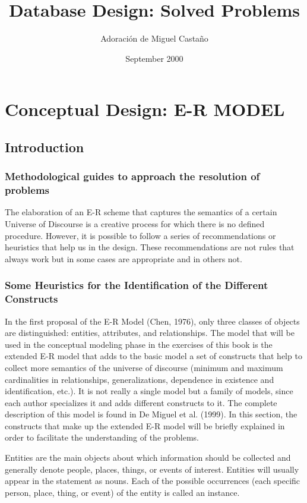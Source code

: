 \documentclass{article}
\title{Database Design: Solved Problems}
\author{Adoración de Miguel Castaño}
\date{September 2000}
\begin{document}
\maketitle

\section{Conceptual Design: E-R MODEL}

\subsection{Introduction}

\subsubsection{
    Methodological guides to approach the resolution of problems
}

The elaboration of an E-R scheme that captures the semantics of a certain Universe of Discourse is a creative process for which there is no defined procedure.  However, it is possible to follow a series of recommendations or heuristics that help us in the design. These recommendations are not rules that always work but in some cases are appropriate and in others not.

\subsubsection{
    Some Heuristics for the Identification of the Different Constructs
}

In the first proposal of the E-R Model (Chen, 1976), only three classes of objects are distinguished: entities, attributes, and relationships. The model that will be used in the conceptual modeling phase in the exercises of this book is the extended E-R model that adds to the basic model a set of constructs that help to collect more semantics of the universe of discourse (minimum and maximum cardinalities in relationships, generalizations, dependence in existence and identification, etc.).  It is not really a single model but a family of models, since each author specializes it and adds different constructs to it.  The complete description of this model is found in De Miguel et al. (1999). In this section, the constructs that make up the extended E-R model will be briefly explained in order to facilitate the understanding of the problems.

Entities are the main objects about which information should be collected and generally denote people, places, things, or events of interest.  Entities will usually appear in the statement as nouns.  Each of the possible occurrences (each specific person, place, thing, or event) of the entity is called an instance.
\end{document}
